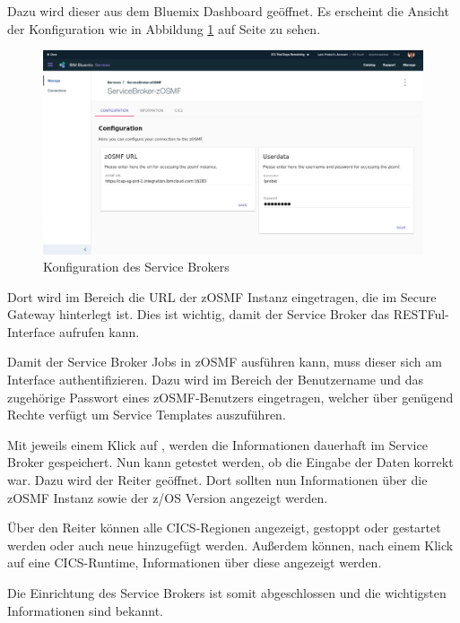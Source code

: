Dazu wird dieser aus dem Bluemix Dashboard geöffnet. Es erscheint die Ansicht der Konfiguration wie in Abbildung
\ref{fig:servicebroker_configuration} auf Seite \pageref{fig:servicebroker_configuration} zu sehen.

\begin{figure}[h]
  \centering
    \includegraphics[scale=0.31]{images/kapitel_3/servicebroker_configuration.pdf}
  \caption{Konfiguration des Service Brokers}
  \label{fig:servicebroker_configuration}
\end{figure}

Dort wird im Bereich  die URL der zOSMF Instanz eingetragen, die im Secure Gateway hinterlegt ist. Dies
ist wichtig, damit der Service Broker das RESTFul-Interface aufrufen kann.

Damit der Service Broker Jobs in zOSMF ausführen kann, muss dieser sich am Interface authentifizieren. Dazu wird im Bereich
 der Benutzername und das zugehörige Passwort eines zOSMF-Benutzers eingetragen, welcher über genügend
Rechte verfügt um Service Templates auszuführen.

Mit jeweils einem Klick auf , werden die Informationen dauerhaft im Service Broker gespeichert. Nun kann
getestet werden, ob die Eingabe der Daten korrekt war. Dazu wird der Reiter  geöffnet. Dort sollten nun
Informationen über die zOSMF Instanz sowie der z/OS Version angezeigt werden.

Über den Reiter  können alle CICS-Regionen angezeigt, gestoppt oder gestartet werden oder auch neue
hinzugefügt werden. Außerdem können, nach einem Klick auf eine CICS-Runtime, Informationen über diese angezeigt werden.

Die Einrichtung des Service Brokers ist somit abgeschlossen und die wichtigsten Informationen sind bekannt.

